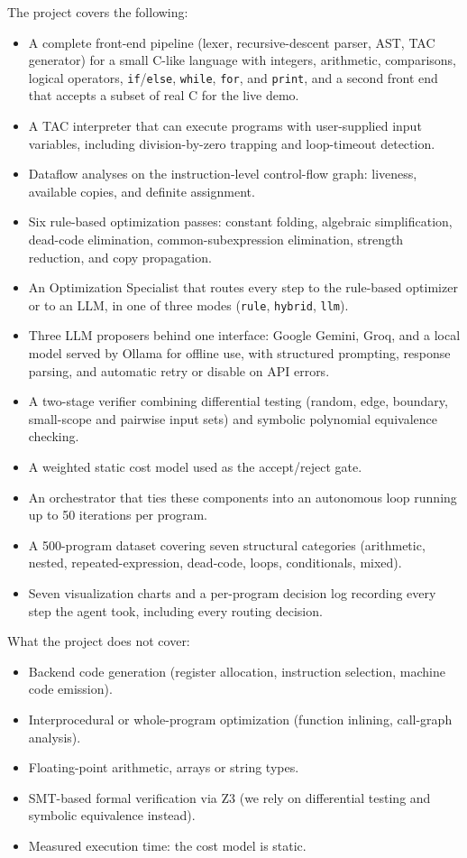 \documentclass[12pt,a4paper]{report}
\begin{document}
The project covers the following:
\begin{itemize}[leftmargin=2cm]
  \item A complete front-end pipeline (lexer, recursive-descent parser, AST, TAC generator) for a small C-like language with integers, arithmetic, comparisons, logical operators, \texttt{if}/\texttt{else}, \texttt{while}, \texttt{for}, and \texttt{print}, and a second front end that accepts a subset of real C for the live demo.
  \item A TAC interpreter that can execute programs with user-supplied input variables, including division-by-zero trapping and loop-timeout detection.
  \item Dataflow analyses on the instruction-level control-flow graph: liveness, available copies, and definite assignment.
  \item Six rule-based optimization passes: constant folding, algebraic simplification, dead-code elimination, common-subexpression elimination, strength reduction, and copy propagation.
  \item An Optimization Specialist that routes every step to the rule-based optimizer or to an LLM, in one of three modes (\texttt{rule}, \texttt{hybrid}, \texttt{llm}).
  \item Three LLM proposers behind one interface: Google Gemini, Groq, and a local model served by Ollama for offline use, with structured prompting, response parsing, and automatic retry or disable on API errors.
  \item A two-stage verifier combining differential testing (random, edge, boundary, small-scope and pairwise input sets) and symbolic polynomial equivalence checking.
  \item A weighted static cost model used as the accept/reject gate.
  \item An orchestrator that ties these components into an autonomous loop running up to 50 iterations per program.
  \item A 500-program dataset covering seven structural categories (arithmetic, nested, repeated-expression, dead-code, loops, conditionals, mixed).
  \item Seven visualization charts and a per-program decision log recording every step the agent took, including every routing decision.
\end{itemize}

What the project does not cover:
\begin{itemize}[leftmargin=2cm]
  \item Backend code generation (register allocation, instruction selection, machine code emission).
  \item Interprocedural or whole-program optimization (function inlining, call-graph analysis).
  \item Floating-point arithmetic, arrays or string types.
  \item SMT-based formal verification via Z3 (we rely on differential testing and symbolic equivalence instead).
  \item Measured execution time: the cost model is static.
\end{itemize}
\end{document}
